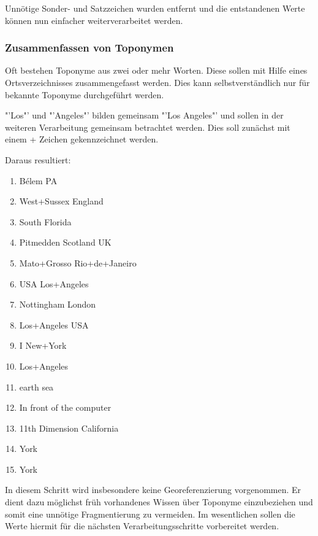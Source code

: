 				Unnötige Sonder- und Satzzeichen wurden entfernt und die entstandenen Werte können nun einfacher weiterverarbeitet werden.

			\subsubsection{Zusammenfassen von Toponymen}

				Oft bestehen Toponyme aus zwei oder mehr Worten.
				Diese sollen mit Hilfe eines Ortsverzeichnisses zusammengefasst werden. 
				Dies kann selbstverständlich nur für bekannte Toponyme durchgeführt werden.
				
				"'Los"' und "'Angeles"' bilden gemeinsam "'Los Angeles"' und sollen in der weiteren Verarbeitung gemeinsam betrachtet werden. 
				Dies soll zunächst mit einem + Zeichen gekennzeichnet werden.

				Daraus resultiert:

				\begin{multicols}{2}
					\begin{enumerate}
						\item Bélem PA
						\item West+Sussex England
						\item South Florida
						\item Pitmedden Scotland UK
						\item Mato+Grosso Rio+de+Janeiro
						\item USA Los+Angeles
						\item Nottingham London
						\item Los+Angeles USA
						\item I New+York 
						\item Los+Angeles
						\item earth sea
						\item In front of the computer
						\item 11th Dimension California
						\item York
						\item York
					\end{enumerate}
				\end{multicols}

				In diesem Schritt wird insbesondere keine Georeferenzierung vorgenommen. 
				Er dient dazu möglichst früh vorhandenes Wissen über Toponyme einzubeziehen und somit eine unnötige Fragmentierung zu vermeiden.
				Im wesentlichen sollen die Werte hiermit für die nächsten Verarbeitungsschritte vorbereitet werden.

